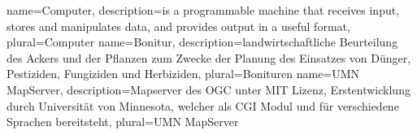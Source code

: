 {
  name=Computer,
  description={is a programmable machine that receives input,
               stores and manipulates data, and provides
               output in a useful format},
  plural=Computer
}
{
  name=Bonitur,
  description={landwirtschaftliche Beurteilung des Ackers und der Pflanzen zum Zwecke der Planung des Einsatzes von Dünger, Pestiziden, Fungiziden und Herbiziden},
  plural=Bonituren
}
{
  name=UMN MapServer,
  description={Mapserver des OGC unter MIT Lizenz, Erstentwicklung durch Universität von Minnesota, welcher als CGI Modul und für verschiedene Sprachen  bereitsteht},
  plural=UMN MapServer
}